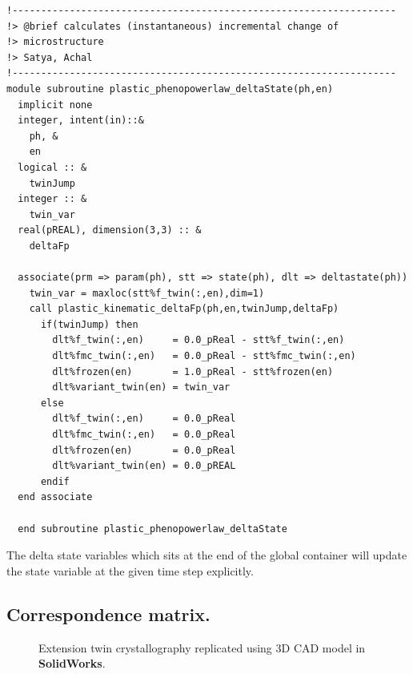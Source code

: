 \begin{verbatim}
!-------------------------------------------------------------------
!> @brief calculates (instantaneous) incremental change of 
!> microstructure
!> Satya, Achal
!-------------------------------------------------------------------
module subroutine plastic_phenopowerlaw_deltaState(ph,en)
  implicit none
  integer, intent(in)::&
    ph, &
    en
  logical :: &
    twinJump
  integer :: &
    twin_var
  real(pREAL), dimension(3,3) :: &
    deltaFp
    
  associate(prm => param(ph), stt => state(ph), dlt => deltastate(ph))
    twin_var = maxloc(stt%f_twin(:,en),dim=1)
    call plastic_kinematic_deltaFp(ph,en,twinJump,deltaFp)
      if(twinJump) then
        dlt%f_twin(:,en)     = 0.0_pReal - stt%f_twin(:,en)
        dlt%fmc_twin(:,en)   = 0.0_pReal - stt%fmc_twin(:,en)
        dlt%frozen(en)       = 1.0_pReal - stt%frozen(en)
        dlt%variant_twin(en) = twin_var 
      else
        dlt%f_twin(:,en)     = 0.0_pReal
        dlt%fmc_twin(:,en)   = 0.0_pReal
        dlt%frozen(en)       = 0.0_pReal
        dlt%variant_twin(en) = 0.0_pREAL
      endif
  end associate
  
  end subroutine plastic_phenopowerlaw_deltaState
\end{verbatim}

The delta state variables which sits at the end of the global container will update the state variable at the given time step explicitly.

\subsection{Correspondence matrix.}
\begin{figure}
    \centering 
    \caption{Extension twin crystallography replicated using 3D CAD model in \textbf{SolidWorks}.}
    \label{Extension twin crystallography}
\end{figure}


